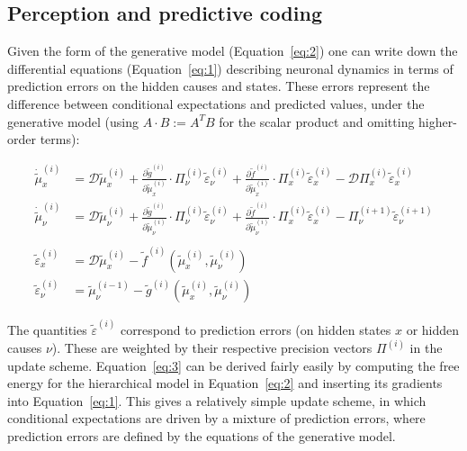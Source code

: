 \documentclass[a4paper]{article} %
\begin{document}
\subsection{Perception and predictive coding}

Given the form of the generative model (Equation~\ref{eq:2}) one can write down
the differential equations (Equation~\ref{eq:1}) describing neuronal dynamics in
terms of prediction errors on the hidden causes and states. These errors
represent the difference between conditional expectations and predicted
values, under the generative model (using $A \cdot B := A^T B$ for the scalar product and omitting higher-order terms):

\begin{align}
\dot{\tilde{\mu}}^{(i)}_x &= \mathcal{D} \tilde{\mu}^{(i)}_x + \frac{\partial \tilde{g}^{(i)}}{\partial \tilde{\mu}^{(i)}_x} \cdot \Pi^{(i)}_\nu \tilde{\varepsilon}^{(i)}_\nu + \frac{\partial \tilde{f}^{(i)}}{\partial \tilde{\mu}^{(i)}_x} \cdot \Pi^{(i)}_x \tilde{\varepsilon}^{(i)}_x -  \mathcal{D}  \Pi^{(i)}_x \tilde{\varepsilon}^{(i)}_x \nonumber \\%
\dot{\tilde{\mu}}^{(i)}_\nu &= \mathcal{D} \tilde{\mu}^{(i)}_\nu + \frac{\partial \tilde{g}^{(i)}}{\partial \tilde{\mu}^{(i)}_\nu} \cdot \Pi^{(i)}_\nu \tilde{\varepsilon}^{(i)}_\nu + \frac{\partial \tilde{f}^{(i)}}{\partial \tilde{\mu}^{(i)}_\nu} \cdot \Pi^{(i)}_x \tilde{\varepsilon}^{(i)}_x - \Pi^{(i+1)}_\nu \tilde{\varepsilon}^{(i+1)}_\nu \nonumber \\%
 \label{eq:3} \\%
\tilde{\varepsilon}^{(i)}_x &= \mathcal{D} \tilde{\mu}^{(i)}_x - \tilde{f}^{(i)}(\tilde{\mu}^{(i)}_x, \tilde{\mu}^{(i)}_\nu) \nonumber \\%
\tilde{\varepsilon}^{(i)}_\nu &= \tilde{\mu}^{(i-1)}_\nu - \tilde{g}^{(i)}(\tilde{\mu}^{(i)}_x, \tilde{\mu}^{(i)}_\nu)  \nonumber  %
\end{align}%

The quantities $\tilde{\varepsilon}^{(i)}$ correspond to prediction errors (on hidden states $x$ or hidden causes $\nu$). These are weighted by their respective precision vectors $\Pi^{(i)}$ in the update scheme. %
Equation~\ref{eq:3} can be derived fairly easily by computing the free energy
for the hierarchical model in Equation~\ref{eq:2} and inserting its gradients
into Equation~\ref{eq:1}. This gives a relatively simple update scheme, in
which conditional expectations are driven by a mixture of prediction
errors, where prediction errors are defined by the equations of the
generative model.
\end{document}
